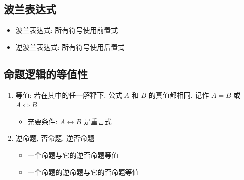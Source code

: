 \documentclass[11pt,a4paper,twocolumn,fleqn]{article} %
\begin{document}
\subsection{波兰表达式} %
\label{sub:polish}
\begin{itemize}
	\item 波兰表达式: 所有符号使用前置式
	\item 逆波兰表达式: 所有符号使用后置式
\end{itemize}
\subsection{命题逻辑的等值性} %
\label{sub:logic_calculation}
\begin{enumerate}
	\item 等值: 若在其中的任一解释下, 公式 $A$ 和 $B$ 的真值都相同. 
	记作 $A = B$ 或 $A\Leftrightarrow B$
	\begin{itemize}
		\item 充要条件: $A\leftrightarrow B$ 是重言式
	\end{itemize}
	\item 逆命题, 否命题, 逆否命题
	\begin{itemize}
		\item 一个命题与它的逆否命题等值
		\item 一个命题的逆命题与它的否命题等值
	\end{itemize}
\end{enumerate}
\end{document}
